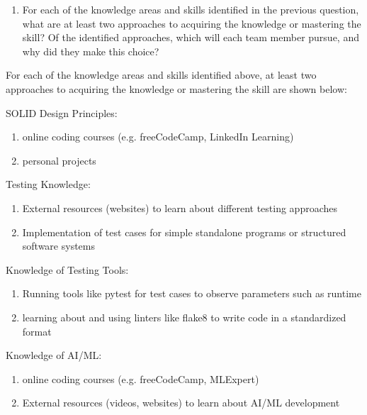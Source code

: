 \documentclass[12pt, titlepage]{article}
\begin{document}
\begin{enumerate}[label=\arabic*., resume*=ar]
  \item For each of the knowledge areas and skills identified in the previous
  question, what are at least two approaches to acquiring the knowledge or
  mastering the skill?  Of the identified approaches, which will each team
  member pursue, and why did they make this choice? \\
\end{enumerate}

For each of the knowledge areas and skills identified above, at least two approaches to acquiring the knowledge or mastering the skill are shown below:
\begin{enumerate}
    \begin{item}
        SOLID Design Principles:
        \begin{enumerate}
            \item online coding courses (e.g. freeCodeCamp, LinkedIn Learning)
            \item personal projects
        \end{enumerate}
    \end{item}
    \begin{item}
        Testing Knowledge:
        \begin{enumerate}
            \item External resources (websites) to learn about different testing approaches
            \item Implementation of test cases for simple standalone programs or structured software systems
        \end{enumerate}
    \end{item}
    \begin{item}
        Knowledge of Testing Tools:
        \begin{enumerate}
            \item Running tools like pytest for test cases to observe parameters such as runtime
            \item learning about and using linters like flake8 to write code in a standardized format
        \end{enumerate}
    \end{item}
    \begin{item}
        Knowledge of AI/ML:
        \begin{enumerate}
            \item online coding courses (e.g. freeCodeCamp, MLExpert)
            \item External resources (videos, websites) to learn about AI/ML development
        \end{enumerate}
    \end{item}
\end{enumerate}
\end{document}
